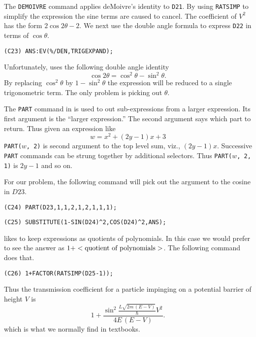 The {\tt DEMOIVRE} command applies deMoivre's identity to {\tt D21}.  By
using {\tt RATSIMP} to simplify the expression the sine terms are caused to
cancel.  The coefficient of $V^2$ has the form $2 \cos 2 \theta - 2$.  We
next use the double angle formula to express {\tt D22} in terms of $\cos
\theta$.

\begin{verbatim}
(C23) ANS:EV(%/DEN,TRIGEXPAND);
\end{verbatim}
Unfortunately, {\Macsyma} uses the following double angle identity
\[
\cos 2\theta = \cos^2 \theta - \sin^2 \theta.
\]
By replacing $\cos^2 \theta$ by $1 - \sin^2 \theta$ the expression will be
reduced to a single trigonometric term.  The only problem is picking out
$\theta$.  

The {\tt PART} command in {\Macsyma} is used to out sub-expressions from
a larger expression.  Its first argument is the ``larger expression.''
The second argument says which part to return.  Thus given an
expression like
\[
w = x^2 + (2y - 1) x + 3
\]
{\tt PART($w$, 2)} is second argument to the top level sum, viz.,
$(2y-1) x$.  Successive {\tt PART} commands can be strung together by
additional selectors.  Thus {\tt PART($w$, 2, 1)} is $2y-1$ and so on.

For our problem, the following command will pick out the argument to the
cosine in $D23$.

\begin{verbatim}
(C24) PART(D23,1,1,2,1,2,1,1,1);
\end{verbatim} 
\begin{verbatim}
(C25) SUBSTITUTE(1-SIN(D24)^2,COS(D24)^2,ANS);
\end{verbatim}
{\Macsyma} likes to keep expressions as quotients of polynomials.  In this case
we would prefer to see the answer as $1 + <\hbox{quotient of polynomials}>$.
The following command does that. 
\begin{verbatim}
(C26) 1+FACTOR(RATSIMP(D25-1));
\end{verbatim}
Thus the transmission coefficient for a particle impinging on a potential
barrier of height $V$ is
\[
1 + \frac{\sin^2 \frac{L \sqrt{2 m\,(E - V)}}{\hbar} V^2}{4 E \, (E - V)}.
\]
which is what we normally find in textbooks.

